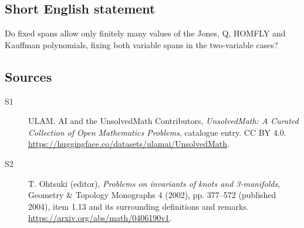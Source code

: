 \documentclass[11pt]{article}
\begin{document}
\subsection{Short English statement}
Do fixed spans allow only finitely many values of the Jones, Q, HOMFLY and Kauffman polynomials, fixing both variable spans in the two-variable cases?
\subsection{Sources}
\begin{description}
\item[\hypertarget{source:statement:1}{S1}] ULAM. AI and the UnsolvedMath Contributors, \emph{UnsolvedMath: A Curated Collection of Open Mathematics Problems}, catalogue entry. CC BY 4.0. \url{https://huggingface.co/datasets/ulamai/UnsolvedMath}.
\item[\hypertarget{source:statement:2}{S2}] T. Ohtsuki (editor), \emph{Problems on invariants of knots and 3-manifolds}, Geometry \& Topology Monographs 4 (2002), pp. 377--572 (published 2004), item 1.13 and its surrounding definitions and remarks. \url{https://arxiv.org/abs/math/0406190v1}.
\end{description}
\label{end:statement}
\end{document}
